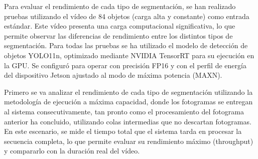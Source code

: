 \documentclass[11pt,spanish,listoffigures,listoftables]{tfgetsinf}
\begin{document}
Para evaluar el rendimiento de cada tipo de segmentación, se han realizado pruebas utilizando el vídeo de 84 objetos (carga alta y constante) como entrada estándar. Este vídeo presenta una carga computacional significativa, lo que permite observar las diferencias de rendimiento entre los distintos tipos de segmentación. Para todas las pruebas se ha utilizado el modelo de detección de objetos YOLO11n, optimizado mediante NVIDIA TensorRT para su ejecución en la GPU. Se configuró para operar con precisión FP16 y con el perfil de energía del dispositivo Jetson ajustado al modo de máxima potencia (MAXN). 


Primero se va analizar el rendimiento de cada tipo de segmentación utilizando la metodología de ejecución a máxima capacidad, donde los fotogramas se entregan al sistema consecutivamente, tan pronto como el procesamiento del fotograma anterior ha concluido, utilizando colas intermedias que no descartan fotogramas. En este escenario, se mide el tiempo total que el sistema tarda en procesar la secuencia completa, lo que permite evaluar su rendimiento máximo (throughput) y compararlo con la duración real del vídeo.
\end{document}
